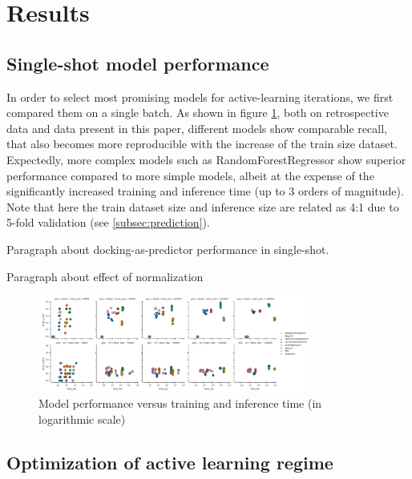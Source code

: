 \section{Results}

\subsection{Single-shot model performance}

In order to select most promising models for active-learning iterations, we first compared them on a single batch. As shown in figure \ref{fig:fig_4}, both on retrospective data \cite{ultralarge_docking_first} and data present in this paper, different models show comparable recall, that also becomes more reproducible with the increase of the train size dataset. Expectedly, more complex models such as RandomForestRegressor show superior performance compared to more simple models, albeit at the expense of the significantly increased training and inference time (up to 3 orders of magnitude). Note that here the train dataset size and inference size are related as 4:1 due to 5-fold validation (see \ref{subsec:prediction}). 

Paragraph about docking-as-predictor performance in single-shot.

Paragraph about effect of normalization

\begin{figure}[h]
\centering
\includegraphics[width=0.8\textwidth]{figures/Figure_4.png}
\caption{Model performance versus training and inference time (in logarithmic scale)}
\label{fig:fig_4}
\end{figure}

\subsection{Optimization of active learning regime}

